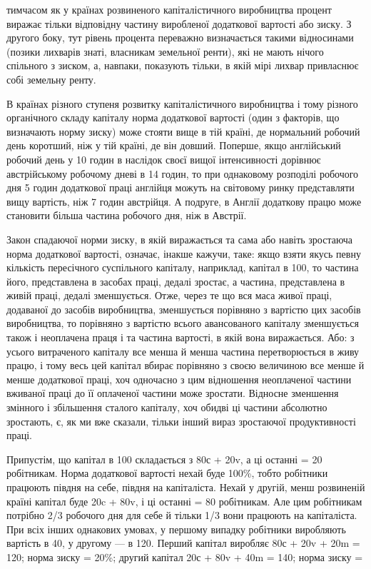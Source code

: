 тимчасом як у країнах розвиненого капіталістичного виробництва
процент виражає тільки відповідну частину виробленої додаткової
вартості або зиску. З другого боку, тут рівень процента переважно
визначається такими відносинами (позики лихварів знаті,
власникам земельної ренти), які не мають нічого спільного з
зиском, а, навпаки, показують тільки, в якій мірі лихвар привласнює
собі земельну ренту.

В країнах різного ступеня розвитку капіталістичного виробництва
і тому різного органічного складу капіталу норма
додаткової вартості (один з факторів, що визначають норму зиску)
може стояти вище в тій країні, де нормальний робочий день
коротший, ніж у тій країні, де він довший. Поперше, якщо
англійський робочий день у 10 годин в наслідок своєї вищої
інтенсивності дорівнює австрійському робочому дневі в 14 годин,
то при однаковому розподілі робочого дня 5 годин додаткової
праці англійця можуть на світовому ринку представляти
вищу вартість, ніж 7 годин австрійця. А подруге, в Англії
додаткову працю може становити більша частина робочого дня,
ніж в Австрії.

Закон спадаючої норми зиску, в якій виражається та сама або
навіть зростаюча норма додаткової вартості, означає, інакше
кажучи, таке: якщо взяти якусь певну кількість пересічного
суспільного капіталу, наприклад, капітал в 100, то частина
його, представлена в засобах праці, дедалі зростає, а частина,
представлена в живій праці, дедалі зменшується. Отже, через
те що вся маса живої праці, додаваної до засобів виробництва,
зменшується порівняно з вартістю цих засобів виробництва,
то порівняно з вартістю всього авансованого капіталу
зменшується також і неоплачена праця і та частина вартості,
в якій вона виражається. Або: з усього витраченого капіталу
все менша й менша частина перетворюється в живу працю,
і тому весь цей капітал вбирає порівняно з своєю величиною
все менше й менше додаткової праці, хоч одночасно з цим відношення
неоплаченої частини вживаної праці до її оплаченої частини
може зростати. Відносне зменшення змінного і збільшення
сталого капіталу, хоч обидві ці частини абсолютно зростають,
є, як ми вже сказали, тільки інший вираз зростаючої продуктивності
праці.

Припустім, що капітал в 100 складається з 80с + 20v, а ці
останні = 20 робітникам. Норма додаткової вартості нехай буде
100\%, тобто робітники працюють півдня на себе, півдня на капіталіста.
Нехай у другій, менш розвиненій країні капітал буде
20c + 80v, і ці останні = 80 робітникам. Але цим робітникам потрібно
2/3 робочого дня для себе й тільки 1/3 вони працюють на
капіталіста. При всіх інших однакових умовах, у першому випадку
робітники виробляють вартість в 40, у другому — в 120.
Перший капітал виробляє 80с + 20v + 20m = 120; норма зиску =
20\%; другий капітал 20с + 80v + 40m = 140; норма зиску =
